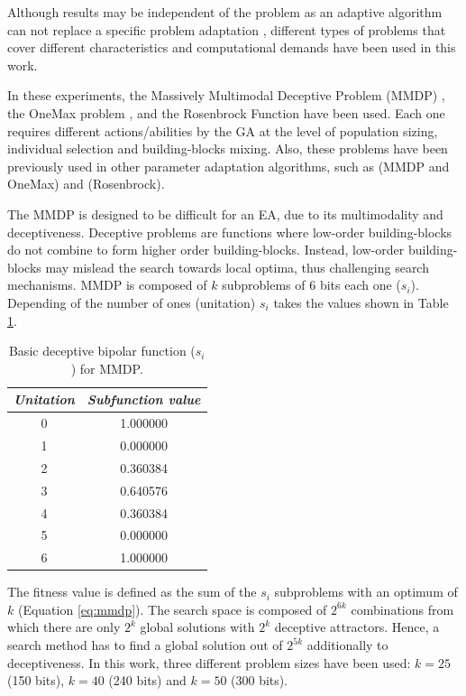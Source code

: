 \documentclass[final,1p,times]{elsarticle}
\begin{document}
Although results may be independent of the problem as an adaptive algorithm can not replace a specific problem adaptation \cite{PanaceasClune05}, different types of problems that cover different characteristics
and computational demands have been used in this work.

In these experiments, the Massively Multimodal Deceptive
Problem (MMDP) \cite{goldberg92massive},  the OneMax problem
\cite{ONEMAX}, and the Rosenbrock Function \cite{CEC2005_Benchmark} have been used. Each one requires different actions/abilities by the GA
at the level of population sizing, individual selection and
building-blocks mixing. Also, these problems have been previously used in other parameter adaptation algorithms, such as \cite{ParallelGATongchim02} (MMDP and OneMax) and \cite{DifferentialWeber09,AdaptationSizesSchlierkamp96} (Rosenbrock). 



The MMDP
 is designed to be difficult for an EA, due to
its multimodality and deceptiveness. Deceptive problems are functions where low-order building-blocks do not combine to form higher order building-blocks. Instead, low-order building-blocks may mislead the search towards local optima, thus challenging search mechanisms. MMDP is composed of $k$ subproblems of 6 bits each one ($s_i$). Depending of
the number of ones (unitation) $s_i$ takes the values shown in Table \ref{table:mmdpvalues}.  

\begin{table}

\centering
{\footnotesize 
\caption{ Basic deceptive bipolar function ($s_i$) for MMDP.}
\label{table:mmdpvalues}
\begin{tabular}{|c|c|}
\hline
{\em Unitation} & {\em Subfunction value}\\
\hline \hline
0 & 1.000000 \\
\hline
1 & 0.000000 \\
\hline
2 & 0.360384 \\
\hline
3 & 0.640576\\
\hline
4 & 0.360384\\
\hline
5 & 0.000000\\
\hline
6 & 1.000000\\
\hline

\end{tabular}
}


\end{table}


The fitness value is defined as the sum of the $s_i$ subproblems with an optimum of $k$ (Equation \ref{eq:mmdp}).
The search space is composed of $2^{6k}$ combinations from which there
are only $2^k$ global solutions with $2^k$ deceptive
attractors. Hence, a search method has to find a global solution
out of $2^{5k}$ additionally to deceptiveness. In this work, three different problem sizes have been used: $k=25$ (150 bits), $k=40$ (240 bits) and $k=50$ (300 bits). 
\end{document}

